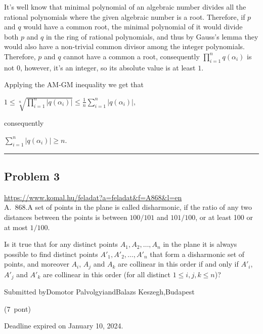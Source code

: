 \documentclass{article}
\begin{document}
It's well know that minimal polynomial of an algebraic number divides all the rational polynomials where the given algebraic number is a root. Therefore, if \(\displaystyle p\) and \(\displaystyle q\) would have a common root, the minimal polynomial of it would divide both \(\displaystyle p\) and \(\displaystyle q\) in the ring of rational polynomials, and thus by Gauss's lemma they would also have a non-trivial common divisor among the integer polynomials. Therefore, \(\displaystyle p\) and \(\displaystyle q\) cannot have a common a root, consequently \(\displaystyle \prod_{i=1}^{n} q(\alpha_i)\) is not \(\displaystyle 0\), however, it's an integer, so its absolute value is at least \(\displaystyle 1\).

Applying the AM-GM inequality we get that

\(\displaystyle 1\le \sqrt[n]{\prod_{i=1}^{n} |q(\alpha_i)|}\le \frac{1}{n}\sum_{i=1}^{n} |q(\alpha_i)|,\)

consequently

\(\displaystyle \sum_{i=1}^{n} |q(\alpha_i)|\ge n.\)

\vspace{1em}
\hrule
\vspace{1em}

\subsection*{Problem 3}
\noindent\url{https://www.komal.hu/feladat?a=feladat&f=A868&l=en}\\[1em]

A. 868.A set of points in the plane is called disharmonic, if the ratio of any two distances between the points is between \(\displaystyle 100/101\) and \(\displaystyle 101/100\), or at least 100 or at most \(\displaystyle 1/100\).

Is it true that for any distinct points \(\displaystyle A_1, A_2,\ldots, A_n\) in the plane it is always possible to find distinct points \(\displaystyle A'_1, A'_2,\ldots,A'_n\) that form a disharmonic set of points, and moreover \(\displaystyle A_i\), \(\displaystyle A_j\) and \(\displaystyle A_k\) are collinear in this order if and only if \(\displaystyle A'_i\), \(\displaystyle A'_j\) and \(\displaystyle A'_k\) are collinear in this order (for all distinct \(\displaystyle 1\le i,j,k\le n\))?

Submitted byDomotor PalvolgyiandBalazs Keszegh,Budapest

(7 pont)

Deadline expired on January 10, 2024.
\end{document}
